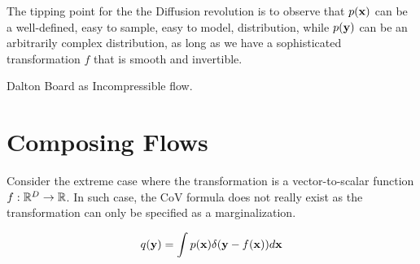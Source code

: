 \documentclass[a4paper, 11pt]{article}
\begin{document}
\begin{center} 
\end{center} 


The tipping point for the the Diffusion revolution is to observe that $p(\mbox{$\mbox{$\mathbf{x}$}$})$ can be a well-defined, easy to sample, easy to model, distribution, while $p(\mbox{$\mbox{$\mathbf{y}$}$})$ can be an arbitrarily complex distribution, as long as we have a sophisticated transformation $f$ that is smooth and invertible.


Dalton Board as Incompressible flow.

\section{Composing Flows}
Consider the extreme case where the transformation is a vector-to-scalar function $f: \mathbb{R}^D \to \mathbb{R}$. In such case, the CoV formula does not really exist as the transformation can only be specified as a marginalization.

\begin{align} \label{eq:extreme_case}
    q(\mbox{$\mbox{$\mathbf{y}$}$}) = \int p(\mbox{$\mbox{$\mathbf{x}$}$}) \delta (\mbox{$\mbox{$\mathbf{y}$}$} - f(\mbox{$\mbox{$\mathbf{x}$}$})) d\mbox{$\mbox{$\mathbf{x}$}$}
\end{align}
\end{document}
